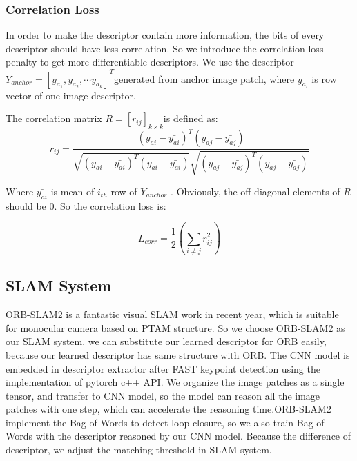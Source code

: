 \documentclass[conference]{IEEEtran}
\begin{document}
\subsubsection{Correlation Loss} 
In order to make the descriptor contain more information, the bits of every descriptor should have less correlation\cite{c14}. So we introduce the correlation loss penalty to get more differentiable descriptors. We use the descriptor       $ Y_{anchor} = \left [ y_{a_1}, y_{a_2},\cdots y_{a_k}\right ]^{T} $generated from anchor image patch, where  $y_{a_i}$ is row vector of one image descriptor.

The correlation matrix $ R=[r_{ij}]_{k \times k} $is defined as:
\begin{equation}
r_{ij} = \frac{(y_{ai}-\bar{y_{ai}})^{T}(y_{aj}-\bar{y_{aj}})}{\sqrt{(y_{ai}-\bar{y_{ai}})^{T}(y_{ai}-\bar{y_{ai}})}\sqrt{(y_{aj}-\bar{y_{aj}})^{T}(y_{aj}-\bar{y_{aj}})}} 
\end{equation}

Where $ \bar{y_{ai}}$  is mean of $i_{th}$ row of $Y_{anchor}$ . Obviously, the off-diagonal elements of $R$ should be 0. So the correlation loss is:

\begin{equation}
L_{corr}=\frac{1}{2} \left(\sum\limits_{i \neq j} r_{ij}^2 \right)
\end{equation}

\subsection{SLAM System} 

ORB-SLAM2 is a fantastic visual SLAM work in recent year, which is suitable for monocular camera based on PTAM structure. So we choose ORB-SLAM2 as our SLAM system. we can substitute our learned descriptor for ORB easily, because our learned descriptor has same structure with ORB. The CNN model is embedded in descriptor extractor after FAST keypoint detection using the implementation of pytorch c++ API. We organize the image patches as a single tensor, and transfer to CNN model, so the model can reason all the image patches with one step, which can accelerate the reasoning time.ORB-SLAM2 implement the Bag of Words to detect loop closure, so we also train Bag of Words with the descriptor reasoned by our CNN model. Because the difference of descriptor, we adjust the matching threshold in SLAM system.

\end{document}

